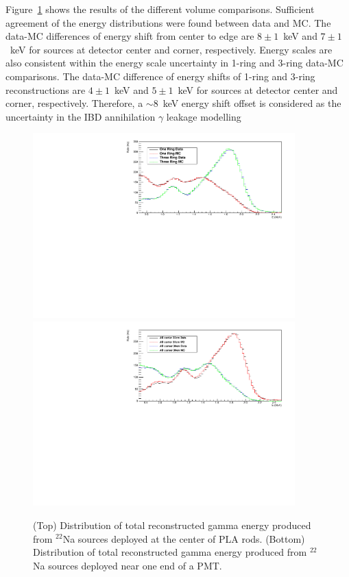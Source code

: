 Figure~\ref{fig:ringtests} shows the results of the different volume comparisons.
Sufficient agreement of the energy distributions were found between data and MC.
The data-MC differences of energy shift from center to edge are $8\pm1$~keV and $7\pm1$~keV for sources at detector center and corner, respectively.
Energy scales are also consistent within the energy scale uncertainty in 1-ring and 3-ring data-MC comparisons.
The data-MC difference of energy shifts of 1-ring and 3-ring reconstructions are $4\pm1$~keV and $5\pm1$~keV for sources at detector center and corner, respectively.
Therefore, a $\sim$8~keV energy shift offset is considered as the uncertainty in the IBD annihilation $\gamma$ leakage modelling
\begin{figure}[h!]
\centering
\includegraphics[width=0.9\textwidth]{Figures/Na22center.pdf}\\
\includegraphics[width=0.9\textwidth]{Figures/Na22_edge.pdf}
\caption[Reconstructed gamma energy of $^{22}$Na at different positions]{(Top) Distribution of total reconstructed gamma energy produced from $^{22}$Na sources deployed at the center of PLA rods.  
(Bottom) Distribution of total reconstructed gamma energy produced from $^{22}$Na sources deployed near one end of a PMT.  }
\label{fig:ringtests}
\end{figure}

